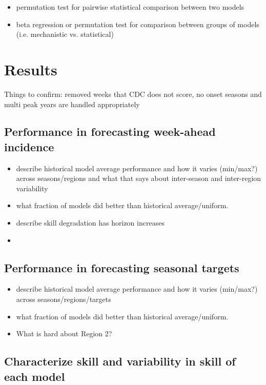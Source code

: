 \documentclass{article}
\begin{document}
\begin{itemize}
    \item permutation test for pairwise statistical comparison between two models
    \item beta regression or permutation test for comparison between groups of models (i.e. mechanistic vs. statistical)
\end{itemize}


\section{Results}

Things to confirm: removed weeks that CDC does not score, no onset seasons and multi peak years are handled appropriately

\subsection{Performance in forecasting week-ahead incidence}

\begin{itemize}
    \item describe historical model average performance and how it varies (min/max?) across seasons/regions and what that says about inter-season and inter-region variability
    \item what fraction of models did better than historical average/uniform.
    \item describe skill degradation has horizon increases
    \item 
\end{itemize}

\subsection{Performance in forecasting seasonal targets}

\begin{itemize}
    \item describe historical model average performance and how it varies (min/max?) across seasons/regions/targets
    \item what fraction of models did better than historical average/uniform.
    \item What is hard about Region 2?
\end{itemize}


\subsection{Characterize skill and variability in skill of each model}
\end{document}
